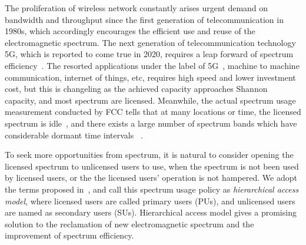%
The proliferation of wireless network constantly arises urgent demand on bandwidth and throughput since the first generation of telecommunication in 1980s, which accordingly encourages the efficient use and reuse of the electromagnetic spectrum.
The next generation of telecommunication technology \gls{5G}, which is reported to come true in 2020, requires a leap forward of spectrum efficiency~\cite{5G_2014}.
The resorted applications under the label of 5G~\cite{5directions5G_2014}, \ie machine to machine communication, internet of things, etc, requires high speed and lower investment cost, but this is changeling as the achieved capacity approaches Shannon capacity, and most spectrum are licensed.
Meanwhile, the actual spectrum usage measurement conducted by FCC tells that at many locations or time, the licensed spectrum is idle~\cite{FCC_spectrumEfficiency_2002}, and there exists a large number of spectrum bands which have considerable dormant time intervals ~\cite{Akyildiz06survey}.

%
To seek more opportunities from spectrum, it is natural to consider opening the licensed spectrum to unlicensed users to use, when the spectrum is not been used by licensed users, or the the licensed users' operation is not hampered.
We adopt the terms proposed in~\cite{zhao_survey_DSA_2007}, and call this spectrum usage policy as \textit{hierarchical access model}, where licensed users are called primary users (\glspl{PU}), and unlicensed users are named as secondary users (\glspl{SU}).
Hierarchical access model gives a promising solution to the reclamation of new electromagnetic spectrum and the improvement of spectrum efficiency.




